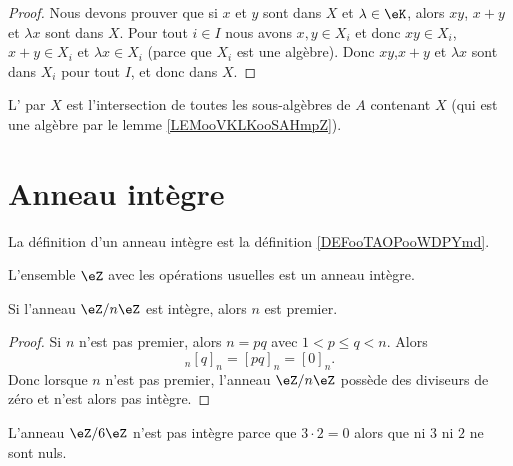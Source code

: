 \begin{proof}
    Nous devons prouver que si \( x\) et \( y\) sont dans \( X\) et \( \lambda\in \eK\), alors \( xy\), \( x+y\) et \( \lambda x\) sont dans \( X\). Pour tout \( i\in I\) nous avons \( x,y\in X_i\) et donc \( xy\in X_i\), \( x+y\in X_i\) et \( \lambda x\in X_i\) (parce que \( X_i\) est une algèbre). Donc \( xy\),\( x+y\) et \( \lambda x\) sont dans \( X_i\) pour tout \( I\), et donc dans \( X\).
\end{proof}

\begin{definition}\label{DefkAXaWY}
    L' par \( X\) est l'intersection de toutes les sous-algèbres de \( A\) contenant \( X\) (qui est une algèbre par le lemme \ref{LEMooVKLKooSAHmpZ}).
\end{definition}

\section{Anneau intègre}
\label{SECAnneauxIntegres}

La définition d'un anneau intègre est la définition \ref{DEFooTAOPooWDPYmd}.

\begin{example}     \label{EXooLDXRooSxUAXs}
    L'ensemble \( \eZ\) avec les opérations usuelles est un anneau intègre.
\end{example}


\begin{lemma}
    Si l'anneau \( \eZ/n\eZ\) est intègre, alors \( n\) est premier.
\end{lemma}

\begin{proof}
    Si \( n\) n'est pas premier, alors \( n=pq\) avec \( 1<p\leq q<n\). Alors
    \begin{equation}
        [p]_n[q]_n=[pq]_n=[0]_n.
    \end{equation}
    Donc lorsque \( n\) n'est pas premier,  l'anneau \( \eZ/n\eZ\) possède des diviseurs de zéro et n'est alors pas intègre.
\end{proof}


\begin{example}
    L'anneau \( \eZ/6\eZ\) n'est pas intègre parce que \( 3\cdot 2=0\) alors que ni \( 3\) ni \( 2\) ne sont nuls.
\end{example}

